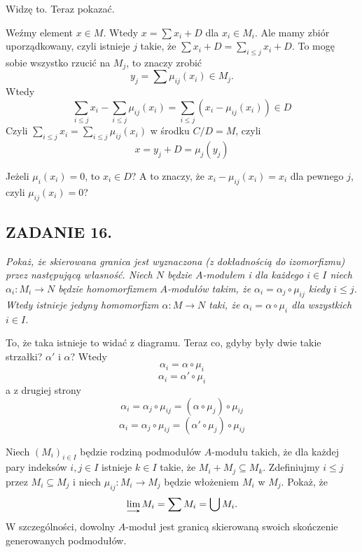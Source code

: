 \documentclass{article}
\begin{document}
Widzę to. Teraz pokazać.

Weźmy element $x\in M$. Wtedy $x=\sum x_i+D$ dla $x_i\in M_i$. Ale mamy zbiór uporządkowany, czyli istnieje $j$ takie, że $\sum x_i+D=\sum\limits_{i\leq j}x_i+D$. To mogę sobie wszystko rzucić na $M_j$, to znaczy zrobić
$$y_j=\sum\mu_{ij}(x_i)\in M_j.$$
 Wtedy
 $$\sum\limits_{i\leq j}x_i-\sum\limits_{i\leq j}\mu_{ij}(x_i)=\sum\limits_{i\leq j}(x_i-\mu_{ij}(x_i))\in D$$
Czyli $\sum\limits_{i\leq j}x_i=\sum\limits_{i\leq j}\mu_{ij}(x_i)$ w środku $C/D=M$, czyli
$$x=y_j+D=\mu_j(y_j)$$
\medskip

Jeżeli $\mu_i(x_i)=0$, to $x_i\in D$? A to znaczy, że $x_i-\mu_{ij}(x_i)=x_i$ dla pewnego $j$, czyli $\mu_{ij}(x_i)=0$? 

\subsection*{ZADANIE 16.}
{\slshape\color{yellow}
Pokaż, że skierowana granica jest wyznaczona (z dokładnością do izomorfizmu) przez następującą własność. Niech $N$ będzie $A$-modułem i dla każdego $i\in I$ niech $\alpha_i:M_i\to N$ będzie homomorfizmem  $A$-modułów takim, że $\alpha_i=\alpha_j\circ\mu_{ij}$ kiedy $i\leq j$. Wtedy istnieje jedyny homomorfizm $\alpha:M\to N$ taki, że $\alpha_i=\alpha\circ\mu_i$ dla wszystkich $i\in I$.
}

\begin{center}
\end{center}

To, że taka istnieje to widać z diagramu. Teraz co, gdyby były dwie takie strzałki? $\alpha'$ i $\alpha$? Wtedy
$$\alpha_i=\alpha\circ\mu_i$$
$$\alpha_i=\alpha'\circ\mu_i$$
a z drugiej strony
$$\alpha_i=\alpha_j\circ\mu_{ij}=(\alpha\circ\mu_j)\circ\mu_{ij}$$
$$\alpha_i=\alpha_j\circ\mu_{ij}=(\alpha'\circ\mu_j)\circ\mu_{ij}$$



\begin{problem}[17]{}
Niech $(M_i)_{i\in I}$ będzie rodziną podmodułów $A$-modułu takich, że dla każdej pary indeksów $i,j\in I$ istnieje $k\in I$ takie, że $M_i+M_j\subseteq M_k$. Zdefiniujmy $i\leq j$ przez $M_i\subseteq M_j$ i niech $\mu_{ij}:M_i\to M_j$ będzie włożeniem $M_i$ w $M_j$. Pokaż, że 
$$\dlim M_i=\sum M_i=\bigcup M_i.$$
W szczególności, dowolny $A$-moduł jest granicą skierowaną swoich skończenie generowanych podmodułów.
\end{problem}
\end{document}
